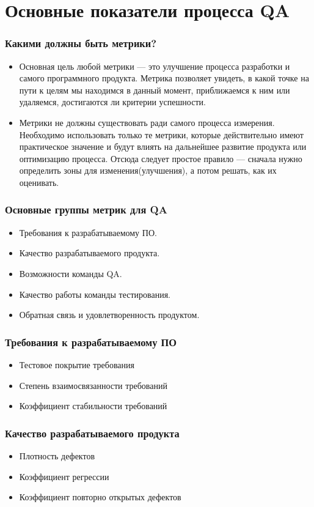 \documentclass{../industrial-development}
\begin{document}
	\section{Основные показатели процесса QA}
	\begin{frame} \frametitle{Какими должны быть метрики?}
		\begin{itemize}
			\item Основная цель любой метрики --- это улучшение процесса разработки и самого программного продукта. Метрика позволяет увидеть, в какой точке на пути к целям мы находимся в данный момент, приближаемся к ним или удаляемся, достигаются ли критерии успешности.
			\item Метрики не должны существовать ради самого процесса измерения. Необходимо использовать только те метрики, которые действительно имеют практическое значение и будут влиять на дальнейшее развитие продукта или оптимизацию процесса. Отсюда следует простое правило --- сначала нужно определить зоны для изменения(улучшения), а потом решать, как их оценивать.
		\end{itemize}
	\end{frame}

	\begin{frame} \frametitle{Основные группы метрик для QA}
		\begin{itemize}
			\item Требования к разрабатываемому ПО.
			\item Качество разрабатываемого продукта.
			\item Возможности команды QA.
			\item Качество работы команды тестирования.
			\item Обратная связь и удовлетворенность продуктом.
		\end{itemize}
	\end{frame}
	\begin{frame} \frametitle{Требования к разрабатываемому ПО}
		\begin{itemize}
			\item Тестовое покрытие требования 
			\item Степень взаимосвязанности требований
			\item Коэффициент стабильности требований
		\end{itemize}
	\end{frame}

	\begin{frame} \frametitle{Качество разрабатываемого продукта}
		\begin{itemize}
			\item Плотность дефектов
			\item Коэффициент регрессии
			\item Коэффициент повторно открытых дефектов
		\end{itemize}
	\end{frame}
\end{document}
